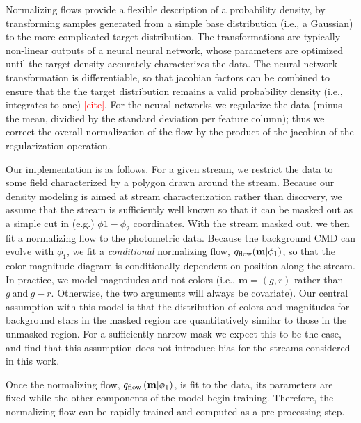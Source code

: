 \documentclass[twocolumn]{aastex631}
\newcommand{\TODO}[1]{{\textcolor{red}{#1}}}
\begin{document}
            Normalizing flows provide a flexible description of a probability
            density, by transforming samples generated from a simple base
            distribution (i.e., a Gaussian) to the more complicated target
            distribution. The transformations are typically non-linear outputs
            of a neural neural network, whose parameters are optimized until the
            target density accurately characterizes the data. The neural network
            transformation is differentiable, so that jacobian factors can be
            combined to ensure that the the target distribution remains a valid
            probability density (i.e., integrates to one) \TODO{[cite]}.
            For the neural networks we regularize the data (minus the mean, dividied by the standard deviation per feature column); thus we correct the overall normalization of the flow by the product of the jacobian of the regularization operation.

            Our implementation is as follows. For a given stream, we restrict
            the data to some field characterized by a polygon drawn around the
            stream. Because our density modeling is aimed at stream
            characterization rather than discovery, we assume that the stream is
            sufficiently well known so that it can be masked out as a simple cut
            in (e.g.) $\phi1-\phi_2$ coordinates. With the stream masked out, we
            then fit a normalizing flow to the photometric data. Because the
            background CMD can evolve with $\phi_1$, we fit a \emph{conditional}
            normalizing flow, $q_{\rm flow}(\mathbf{m}|\phi_1)$, so that the
            color-magnitude diagram is conditionally dependent on position along
            the stream. In practice, we model magntiudes and not colors (i.e.,
            $\mathbf{m} = (g,r)$ rather than $g \ \mathrm{and} \ g-r$.
            Otherwise, the two arguments will always be covariate). Our central
            assumption with this model is that the distribution of colors and
            magnitudes for background stars in the masked region are
            quantitatively similar to those in the unmasked region. For a
            sufficiently narrow mask we expect this to be the case, and find
            that this assumption does not introduce bias for the streams
            considered in this work.
                
            Once the normalizing flow, $q_{\rm flow}\left(\mathbf{m} |
            \phi_1\right)$, is fit to the data, its parameters are fixed while
            the other components of the model begin training. Therefore, the
            normalizing flow can be rapidly trained and computed as a
            pre-processing step.
\end{document}
